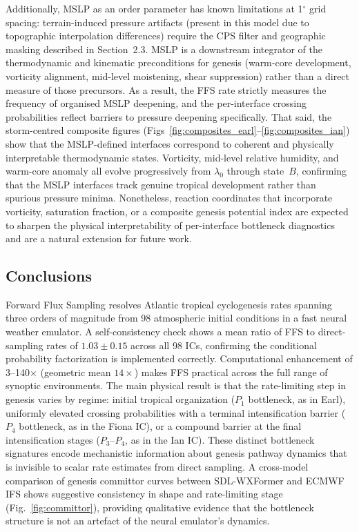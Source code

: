 \documentclass[11pt]{article}
\begin{document}
Additionally, MSLP as an order parameter has known limitations at 1$^\circ$ grid spacing:
terrain-induced pressure artifacts (present in this model due to topographic interpolation
differences) require the CPS filter and geographic masking described in Section~2.3.
MSLP is a downstream integrator of the thermodynamic and kinematic preconditions for
genesis (warm-core development, vorticity alignment, mid-level moistening, shear
suppression) rather than a direct measure of those precursors.
As a result, the FFS rate strictly measures the frequency of organised MSLP deepening,
and the per-interface crossing probabilities reflect barriers to pressure deepening
specifically.
That said, the storm-centred composite figures (Figs~\ref{fig:composites_earl}--\ref{fig:composites_ian})
show that the MSLP-defined interfaces correspond to coherent and physically interpretable
thermodynamic states. Vorticity, mid-level relative humidity, and warm-core anomaly all
evolve progressively from $\lambda_0$ through state~$B$, confirming that the MSLP
interfaces track genuine tropical development rather than spurious pressure minima.
Nonetheless, reaction coordinates that incorporate vorticity, saturation fraction, or a
composite genesis potential index \citep[e.g.,][]{bister1998dissipative,camargo2007use}
are expected to sharpen the physical interpretability of per-interface bottleneck
diagnostics and are a natural extension for future work.

\subsection{Conclusions}

Forward Flux Sampling resolves Atlantic tropical cyclogenesis rates spanning three orders
of magnitude from 98 atmospheric initial conditions in a fast neural weather emulator.
A self-consistency check shows a mean ratio of FFS to direct-sampling rates of
$1.03\pm0.15$ across all 98 ICs, confirming the conditional probability factorization
is implemented correctly.
Computational enhancement of 3--140$\times$ (geometric mean $14\times$) makes FFS
practical across the full range of synoptic environments. The main physical result is
that the rate-limiting step in genesis varies by regime: initial tropical organization
($P_1$ bottleneck, as in Earl), uniformly elevated crossing probabilities with a terminal
intensification barrier ($P_4$ bottleneck, as in the Fiona IC), or a compound
barrier at the final intensification stages ($P_3$--$P_4$, as in the Ian IC).
These distinct bottleneck signatures encode mechanistic information about genesis pathway
dynamics that is invisible to scalar rate estimates from direct sampling.
A cross-model comparison of genesis committor curves between SDL-WXFormer and ECMWF IFS
shows suggestive consistency in shape and rate-limiting stage (Fig.~\ref{fig:committor}),
providing qualitative evidence that the bottleneck structure is not an artefact of the
neural emulator's dynamics.
\end{document}

